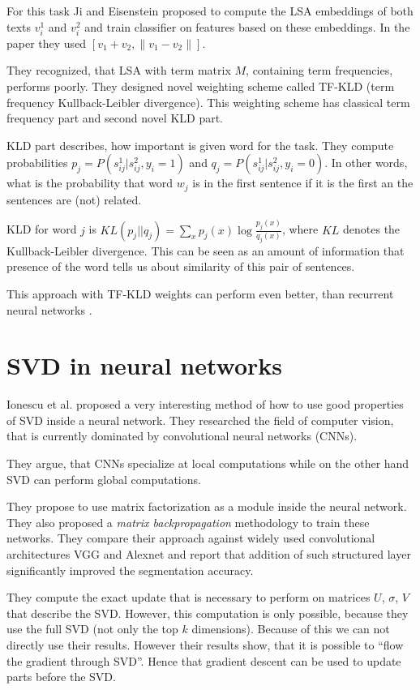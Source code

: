         For this task Ji and Eisenstein proposed to compute the LSA embeddings of both texts $v_i^1$ and $v_i^2$ and train classifier on features based on these embeddings.
        In the paper they used $[v_1 + v_2, \| v_1- v_2 \|]$.
        
        They recognized, that LSA with term matrix $M$, containing term frequencies, performs poorly. 
        They designed novel weighting scheme called TF-KLD (term frequency Kullback-Leibler divergence). 
        This weighting scheme has classical term frequency part and second novel KLD part.
        
        KLD part describes, how important is given word for the task.
        They compute probabilities $p_j = P(s_{ij}^1| s_{ij}^2, y_i=1)$ and $q_j = P(s_{ij}^1| s_{ij}^2, y_i=0)$.
        In other words, what is the probability that word $w_j$ is in the first sentence if it is the first an the sentences are (not) related.
        
        KLD for word $j$ is $KL(p_j || q_j) = \sum_x p_j(x) \log \frac{p_j(x)}{q_j(x)}$, where $KL$ denotes the Kullback-Leibler divergence.
        This can be seen as an amount of information that presence of the word tells us about similarity of this pair of sentences. 
    
        This approach with TF-KLD weights can perform even better, than recurrent neural networks \cite{conneau2017supervised}.
    
    
    \cite{wu2017balancing} %
    \cite{deng2014study} %
    \cite{lan2009supervised} %


\section{SVD in neural networks}
    Ionescu et al. \cite{ionescu2015training} %
    proposed a very interesting method of how to use good properties of SVD inside a neural network.
    They researched the field of computer vision, that is currently dominated by convolutional neural networks (CNNs).
    
    They argue, that CNNs specialize at local computations while on the other hand SVD can perform global computations.
    
    They propose to use matrix factorization as a module inside the neural network.
    They also proposed a \emph{matrix backpropagation} methodology to train these networks.
    They compare their approach against widely used convolutional architectures VGG and Alexnet and report that addition of such structured layer significantly improved the segmentation accuracy.
    
    They compute the exact update that is necessary to perform on matrices $U$, $\sigma$, $V$ that describe the SVD.
    However, this computation is only possible, because they use the full SVD (not only the top $k$ dimensions).
    Because of this we can not directly use their results.
    However their results show, that it is possible to ``flow the gradient through SVD''.
    Hence that gradient descent can be used to update parts before the SVD.
    
    
